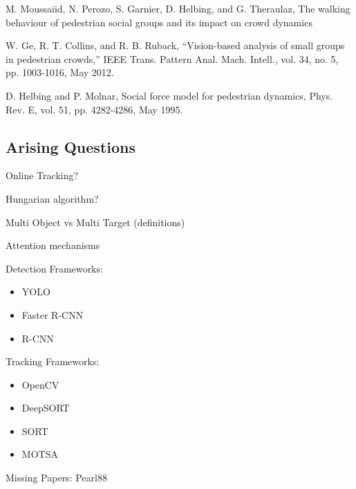 M. Moussaiid, N. Perozo, S. Garnier, D. Helbing, and G. Theraulaz, The walking behaviour of pedestrian social groups and its impact on crowd dynamics

W. Ge, R. T. Collins, and R. B. Ruback, “Vision-based analysis of small groups in pedestrian crowds,” IEEE Trans. Pattern Anal. Mach. Intell., vol. 34, no. 5, pp. 1003-1016, May 2012.

D. Helbing and P. Molnar, Social force model for pedestrian dynamics, Phys. Rev. E, vol. 51, pp. 4282-4286, May 1995.

\subsection{Arising Questions}

Online Tracking?

Hungarian algorithm?

Multi Object vs Multi Target (definitions)

Attention mechanisms

Detection Frameworks:
\begin{itemize}
    \item YOLO
    \item Faster R-CNN
    \item R-CNN
\end{itemize}

Tracking Frameworks:
\begin{itemize}
    \item OpenCV
    \item DeepSORT
    \item SORT
    \item MOTSA
\end{itemize}

Missing Papers:
Pearl88